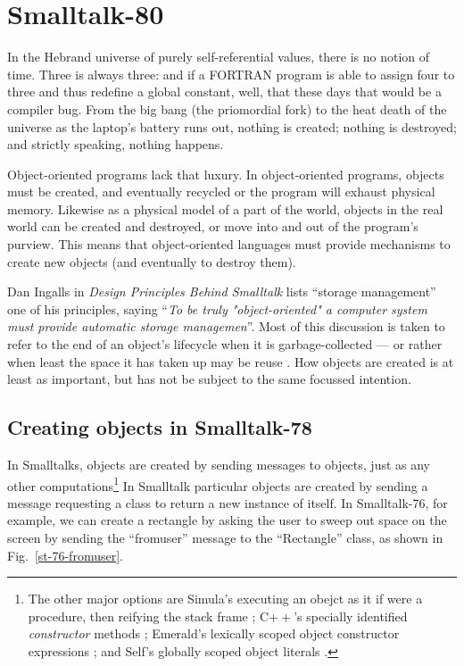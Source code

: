\section{Smalltalk-80}

In the Hebrand universe of purely self-referential values, there is no
notion of time. Three is always three: and if a FORTRAN program is
able to assign four to three and thus redefine a global constant,
well, that these days that would be a compiler bug. From the big bang
(the priomordial fork) to the heat death of the universe as the
laptop's battery runs out, nothing is created; nothing is destroyed;
and strictly speaking, nothing happens.

Object-oriented programs lack that luxury. In object-oriented
programs, objects must be created, and eventually recycled or the
program will exhaust physical memory. Likewise as a physical model of
a part of the world, objects in the real world can be created and
destroyed, or move into and out of the program's purview. This means
that object-oriented languages must provide mechanisms to create new
objects (and eventually to destroy them).  

Dan Ingalls in \textit{Design Principles Behind Smalltalk}
\cite{ingalls-byte1981} lists ``storage management'' one of his
principles, saying ``\textit{To be truly "object-oriented" a computer
  system must provide automatic storage managemen}''. Most of this
discussion is taken to refer to the end of an object's lifecycle when
it is garbage-collected --- or rather when least the space it has
taken up may be reuse \cite{gc-book-perhpas}. How objects are created
is at least as important, but has not be subject to the same focussed
intention.

\subsection{Creating objects in Smalltalk-78}

In Smalltalks, objects are created by sending messages to objects,
just as any other computations\footnote{The other major options are
Simula's executing an obejct as it if were a procedure, then reifying
the stack frame \cite{simiula-beta}; C$++$'s specially identified
\textit{constructor} methods \cite{c++design-and-evolution}; Emerald's
lexically scoped object constructor expressions \cite{emerald}; and
Self's globally scoped object literals \cite{selfPower}.} In Smalltalk
particular objects are created by sending a message requesting a class
to return a new instance of itself. 
In Smalltalk-76, for example, we can create a rectangle by asking the
user to sweep out space on the screen by sending the
``\textsf{fromuser}'' message to the ``\textsf{Rectangle}'' class,
as shown in Fig.~\ref{st-76-fromuser}.

